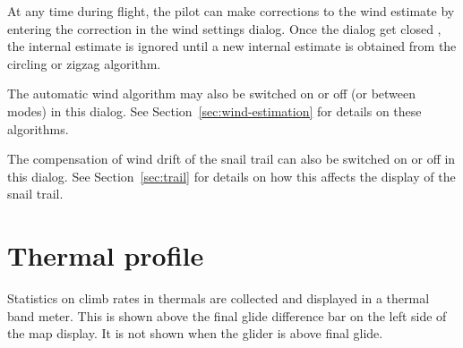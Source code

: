 \documentclass[a4paper,12pt]{refrep}
\begin{document}
At any time during flight, the pilot can make corrections to the wind
estimate by entering the correction in the wind settings dialog.  Once the
dialog get closed , the internal estimate is ignored until a new internal
estimate is obtained from the circling or zigzag algorithm.

The automatic wind algorithm may also be switched on or off (or
between modes) in this dialog.  See Section~\ref{sec:wind-estimation}
for details on these algorithms.

The compensation of wind drift of the snail trail can also be switched
on or off in this dialog.  See Section~\ref{sec:trail} for details on
how this affects the display of the snail trail.

\section{Thermal profile}

Statistics on climb rates in thermals are collected and displayed in a
thermal band meter.  This is shown above the final glide difference
bar on the left side of the map display.  It is not shown when the
glider is above final glide.  

\vskip 2cm
\end{document}

